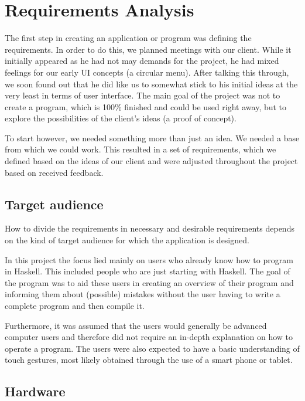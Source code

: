\chapter{Requirements Analysis}

The first step in creating an application or program was defining the requirements. In order to do this, we planned meetings with our client.
While it initially appeared as he had not may demands for the project, he had mixed feelings for our early UI concepts (a circular menu). After talking this through, we soon found out that he did like us to somewhat stick to his initial ideas at the very least in terms of user interface. The main goal of the project was not to create a program, which is 100\% finished and could be used right away, but to explore the possibilities of the client's ideas (a proof of concept).

To start however, we needed something more than just an idea. We needed a base from which we could work. This resulted in a set of requirements, which we defined based on the ideas of our client and were adjusted throughout the project based on received feedback.

\section{Target audience}

How to divide the requirements in necessary and desirable requirements depends on the kind of target audience for which the application is designed.  

In this project the focus lied mainly on users who already know how to program in Haskell. This included people who are just starting with Haskell.
The goal of the program was to aid these users in creating an overview of their program and informing them about (possible) mistakes without the user having to write a complete program and then compile it.

Furthermore, it was assumed that the users would generally be advanced computer users and therefore did not require an in-depth explanation on how to operate a program. The users were also expected to have a basic understanding of touch gestures, most likely obtained through the use of a smart phone or tablet.

\section{Hardware}

